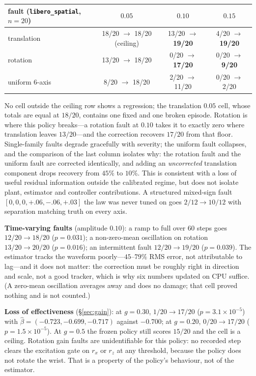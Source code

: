 \documentclass{article}
\newcommand{\code}[1]{\texttt{\small #1}}
\begin{document}
\begin{center}\small
\begin{tabular}{lccc}
\toprule
fault (\code{libero\_spatial}, $n=20$) & $0.05$ & $0.10$ & $0.15$ \\
\midrule
translation & 18/20 $\to$ 18/20 (ceiling) & 13/20 $\to$ \textbf{19/20} & 4/20 $\to$ \textbf{19/20} \\
rotation    & 13/20 $\to$ 18/20 & 0/20 $\to$ \textbf{17/20} & 0/20 $\to$ \textbf{9/20} \\
uniform 6-axis & 8/20 $\to$ 18/20 & 2/20 $\to$ 11/20 & 0/20 $\to$ 2/20 \\
\bottomrule
\end{tabular}
\end{center}

No cell outside the ceiling row shows a regression; the translation $0.05$ cell, whose
totals are equal at $18/20$, contains one fixed and one broken episode. Rotation is where
this policy breaks---a rotation fault at
$0.10$ takes it to exactly zero where translation leaves $13/20$---and the correction
recovers $17/20$ from that floor. Single-family faults degrade gracefully with severity; the
uniform fault collapses, and the comparison of the last column isolates why: the rotation
fault and the uniform fault are corrected identically, and adding an \emph{uncorrected}
translation component drops recovery from $45\%$ to $10\%$. This is consistent with a loss
of useful residual information outside the calibrated regime, but does not isolate plant,
estimator and controller contributions. A structured
mixed-sign fault $[0,0,0,+.06,-.06,+.03]$ the law was never tuned on goes $2/12\to10/12$ with
separation matching truth on every axis.

\textbf{Time-varying faults} (amplitude $0.10$): a ramp to full over 60 steps goes
$12/20\to18/20$ ($p=0.031$); a non-zero-mean oscillation on rotation $13/20\to20/20$
($p=0.016$); an intermittent fault $12/20\to19/20$ ($p=0.039$). The estimator tracks the
waveform poorly---$45$--$79\%$ RMS error, not attributable to lag---and it does not matter:
the correction must be roughly right in direction and scale, not a good tracker, which is
why six numbers updated on CPU suffice. (A zero-mean oscillation averages away and does no
damage; that cell proved nothing and is not counted.)

\textbf{Loss of effectiveness} (\S\ref{sec:gain}): at $g=0.30$, $1/20\to17/20$
($p=3.1\times10^{-5}$) with $\hat\beta = (-0.723,-0.699,-0.717)$ against $-0.700$; at
$g=0.20$, $0/20\to17/20$ ($p=1.5\times10^{-5}$). At $g=0.5$ the frozen policy still scores
$15/20$ and the cell is a ceiling. Rotation gain faults are unidentifiable for this policy:
no recorded step clears the excitation gate on $r_x$ or $r_z$ at any threshold, because the
policy does not rotate the wrist. That is a property of the policy's behaviour, not of the
estimator.
\end{document}
